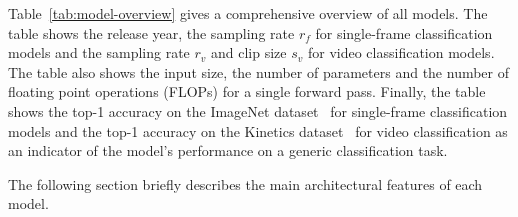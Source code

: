 \documentclass[a4paper]{article}
\begin{document}
Table~\ref{tab:model-overview} gives a comprehensive overview of all models. The
table shows the release year, the sampling rate $r_f$ for single-frame
classification models and the sampling rate $r_v$ and clip size $s_v$ for video
classification models. The table also shows the input size, the number of
parameters and the number of floating point operations (FLOPs) for a single
forward pass. Finally, the table shows the top-1 accuracy on the ImageNet
dataset~\cite{imagenet} for single-frame classification models and the top-1
accuracy on the Kinetics dataset~\cite{kinetics} for video classification as an
indicator of the model's performance on a generic classification task.

The following section briefly describes the main architectural features of each
model.

\end{document}
